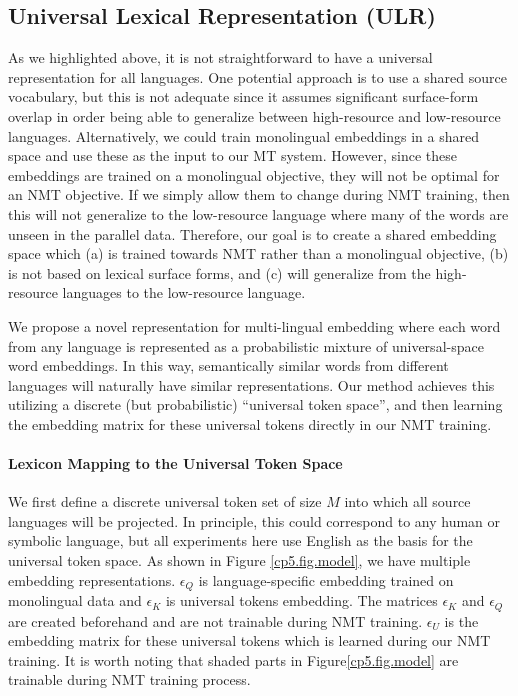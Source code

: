 \subsection{Universal Lexical Representation (ULR)}
\label{cp5.sec.unilex}

As we highlighted above, it is not straightforward to have a universal representation  for all languages. One potential approach is to use a shared source vocabulary, but this is not adequate since it assumes significant  surface-form overlap in order being able to generalize between high-resource and low-resource languages. Alternatively, we could train monolingual embeddings in a shared space and use these as the input to our MT system. However, since these embeddings are trained on a monolingual objective, they will not be optimal for an NMT objective. If we simply allow them to change during NMT training, then this will not generalize to the low-resource language where many of the words are unseen in the parallel data.
Therefore, our goal is to create a shared embedding space which (a) is trained towards NMT rather than a monolingual objective, (b) is not based on lexical surface forms, and (c) will generalize from the high-resource languages to the low-resource language. 

We propose a novel representation for multi-lingual embedding where each word from any language is represented as a probabilistic mixture of universal-space word embeddings. In this way, semantically similar words from different languages will naturally have similar representations. Our  method achieves this  utilizing a discrete (but probabilistic) ``universal token space'', and then learning the embedding matrix for these universal tokens directly in our NMT training.

\paragraph{Lexicon Mapping to the Universal Token Space}
We first define a discrete universal token set of size $M$ into which all source languages will be projected. In principle, this could correspond to any human or symbolic language, but all experiments here use English as the basis for the universal token space. As shown in Figure \ref{cp5.fig.model}, we have multiple embedding representations. $\epsilon_Q$ is language-specific embedding trained on  monolingual data and $\epsilon_K$ is universal tokens embedding. The matrices $\epsilon_K$ and $\epsilon_Q$ are created beforehand and are not trainable during NMT training.  $\epsilon_U$ is the embedding matrix for these universal tokens which is learned during  our NMT training.  It is worth noting that shaded parts in Figure\ref{cp5.fig.model} are trainable during  NMT training process.

